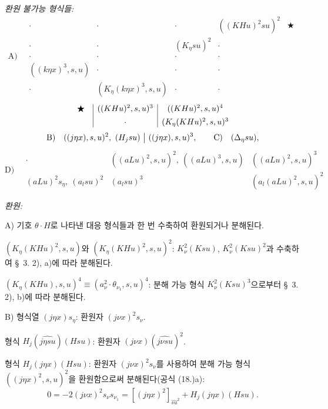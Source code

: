 \noindent\emph{환원 불가능 형식들:}
\[
\text{A)}\quad
\begin{array}{c|c|c|c|c}
\cdot&\cdot&\cdot&((KHu)^2su)^2&\bigstar\\[0.35em]
\cdot&\cdot&(K_\eta su)^2&\cdot&\\[0.35em]
\cdot&\cdot&\cdot&\cdot&\\[0.35em]
((k\eta x)^3,s,u)&\cdot&\cdot&\cdot&\\[0.35em]
\cdot&(K_\eta(k\eta x)^3,s,u)&\cdot&\cdot&
\end{array}
\]
\[
\begin{array}{c@{\quad}|c|c}
\bigstar&((KHu)^2,s,u)^3&((KHu)^2,s,u)^4\\[0.45em]
&\cdot&(K_\eta(KHu)^2,s,u)^3
\end{array}
\]
\[
\text{B)}\quad ((j\eta x),s,u)^2,\ (H_jsu)\ \big|\ ((j\eta x),s,u)^3,
\qquad \text{C)}\quad (\Delta_\eta su),
\]
\[
\text{D)}\quad
\begin{array}{c|c|c}
\cdot&((aLu)^2,s,u)^2,\ ((aLu)^3,s,u)&((aLu)^2,s,u)^3\\[0.5em]
(aLu)^2s_\eta,\ (a_lsu)^2&(a_lsu)^3&(a_l(aLu)^2,s,u)^2
\end{array}
\]

\noindent\emph{환원:}

A) 기호 $\theta\cdot H$로 나타낸 대응 형식들과 한 번 수축하여 환원되거나 분해된다.

$(K_\eta(KHu)^2,s,u)$와 $(K_\eta(KHu)^2,s,u)^2$: $K_\nu^2(Ksu)$, $K_\nu^2(Ksu)^2$과 수축하여 \S\ 3. 2), a)에 따라 분해된다.

$(K_\eta(KHu),s,u)^4\equiv(a_\nu^2\cdot\theta_{\nu_1},s,u)^4$: 분해 가능 형식 $K_\nu^2(Ksu)^3$으로부터 \S\ 3. 2), b)에 따라 분해된다.

B) 형식열 $(j\eta x)s_\eta$: 환원자 $(j\nu x)^2s_\nu$.

형식 $H_j(\widehat{j\eta su})(Hsu)$: 환원자 $(j\nu x)(\widehat{j\nu su})^2$.

형식 $H_j(j\eta x)(Hsu)$: 환원자 $(j\nu x)^2s_\nu$를 사용하여 분해 가능 형식 $((j\eta x)^2,s,u)^2$을 환원함으로써 분해된다(공식 (18.)a):
\[
0=-2(j\nu x)^2s_\nu s_{\nu_1}=[(j\eta x)^2]_{\widehat{su}^2}+H_j(j\eta x)(Hsu).
\]

